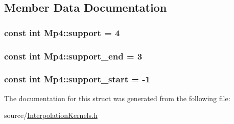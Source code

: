\subsection{Member Data Documentation}
\hypertarget{struct_mp4_a9601f80a27b6863d3923fc9d2f45fd20}{}
\subsubsection[{support}]{\setlength{\rightskip}{0pt plus 5cm}const int Mp4\+::support = 4\hspace{0.3cm}{\ttfamily [static]}}\label{struct_mp4_a9601f80a27b6863d3923fc9d2f45fd20}
\hypertarget{struct_mp4_a90b6d0fb8de4d7850d5c95272c74878a}{}
\subsubsection[{support\+\_\+end}]{\setlength{\rightskip}{0pt plus 5cm}const int Mp4\+::support\+\_\+end = 3\hspace{0.3cm}{\ttfamily [static]}}\label{struct_mp4_a90b6d0fb8de4d7850d5c95272c74878a}
\hypertarget{struct_mp4_ab2bf493e922fb8082f05ca118cd472b3}{}
\subsubsection[{support\+\_\+start}]{\setlength{\rightskip}{0pt plus 5cm}const int Mp4\+::support\+\_\+start = -\/1\hspace{0.3cm}{\ttfamily [static]}}\label{struct_mp4_ab2bf493e922fb8082f05ca118cd472b3}


The documentation for this struct was generated from the following file\+:\begin{DoxyCompactItemize}
\item 
source/\hyperlink{_interpolation_kernels_8h}{Interpolation\+Kernels.\+h}\end{DoxyCompactItemize}
